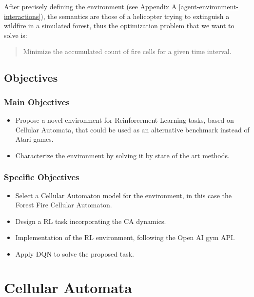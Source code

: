 \documentclass[
  12pt,
  openany]{book}
\providecommand{\tightlist}{%
  \setlength{\itemsep}{0pt}\setlength{\parskip}{0pt}}
\begin{document}
After precisely defining the environment (see Appendix A \ref{agent-environment-interactions}), the semantics are those of a helicopter trying to extinguish a wildfire in a simulated forest, thus the optimization problem that we want to solve is:

\begin{quote}
Minimize the accumulated count of fire cells for a given time interval.
\end{quote}

\hypertarget{objectives}{%
\section{Objectives}\label{objectives}}

\hypertarget{main-objectives}{%
\subsection{Main Objectives}\label{main-objectives}}

\begin{itemize}
\tightlist
\item
  Propose a novel environment for Reinforcement Learning tasks, based on Cellular Automata, that could be used as an alternative benchmark instead of Atari games.
\item
  Characterize the environment by solving it by state of the art methods.
\end{itemize}

\hypertarget{specific-objectives}{%
\subsection{Specific Objectives}\label{specific-objectives}}

\begin{itemize}
\tightlist
\item
  Select a Cellular Automaton model for the environment, in this case the Forest Fire Cellular Automaton.
\item
  Design a RL task incorporating the CA dynamics.
\item
  Implementation of the RL environment, following the Open AI gym API.
\item
  Apply DQN to solve the proposed task.
\end{itemize}

\hypertarget{cellular-automata}{%
\chapter{Cellular Automata}\label{cellular-automata}}
\end{document}
